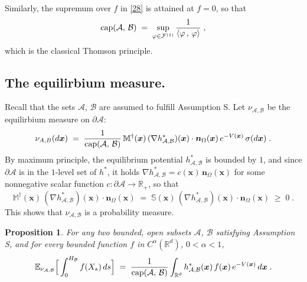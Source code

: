 \documentclass[reqno]{amsart}
\newtheorem{proposition}[theorem]{Proposition}
\newcounter{as}[section]
\newcommand{\mc}[1]{{\mathcal #1}}
\newcommand{\bb}[1]{{\mathbb #1}}
\newcommand{\bs}[1]{{\boldsymbol #1}}
\newcommand{\<}{\langle}
\renewcommand{\>}{\rangle}
\renewcommand{\Cap}{{\rm cap}}
\begin{document}
Similarly, the supremum over $f$ in \eqref{28} is attained at $f=0$,
so that
\begin{equation}
\label{29}
\Cap (\mc A,\,\mc B) \;=\; \sup_{\varphi \in \mathcal  F^{(1)}}
\frac 1{\< \varphi \,,\, \varphi \>} \;,
\end{equation}
which is the classical Thomson principle.

\subsection{The equilirbium measure.}

Recall that the sets $\mc A$, $\mc B$ are assumed to fulfill
Assumption S.  Let $\nu_{\mc A,\mc B}$ be the equilirbium measure on
$\partial \mc A$:
\begin{equation}
\label{2-2}
\nu_{A,B} (d\bs{x}) \;=\; \frac {1}{\Cap(\mc A,\,\mc B)} \, \bb M^\dagger(\bs{x}) \, (\nabla
h^*_{\mc A,\mc B}) (\bs{x}) \cdot \bs n_{\Omega}(\bs{x})\, e^{-V(\bs{x})}\, \sigma(d\bs{x})\;.
\end{equation}
By maximum principle, the equilibrium potential $h^*_{\mc A,\mc B}$ is bounded by $1$, and since $\partial \mc A$ is in the $1$-level set of $h^\ast$, it holds $\nabla h^*_{\mc A,\mc B} = c(\bs{x}) \,
  \bs n_{\Omega}(\bs{x})$ for some nonnegative scalar function $c\colon \partial \mc A \to \bb R_+$, so that
\begin{equation*}
\bb M^\dagger(\bs{x}) \, (\nabla h^*_{\mc A,\mc B}) (\bs{x})
\cdot \bs n_{\Omega}(\bs{x}) \;=\;
\bb S(\bs{x}) \, (\nabla h^*_{\mc A,\mc B}) (\bs{x})
\cdot \bs n_{\Omega}(\bs{x}) \; \ge\; 0\;.
\end{equation*}
This shows that $\nu_{\mc A,\mc B}$ is a probability measure.

\begin{proposition}
\label{prop3}
For any two bounded, open subsets $\mc A$, $\mc B$ satisfying Assumption S, and for every bounded function $f$ in $C^\alpha (\bb R^d)$, $0<\alpha<1$,
\begin{equation}
\label{11}
\bb E_{\nu_{\mc A,\mc B}} \Big[ \int_0^{H_\mc B} f(X_s) \, ds \Big] \;=\;
\frac {1} {\Cap (\mc A,\,\mc B)} \int_{\bb R^d} h^*_{\mc A,\mc B} (\bs{x}) \, f(\bs{x}) \,
e^{-V(\bs{x})}\, d\bs{x} \;.
\end{equation}
\end{proposition}
\end{document}
